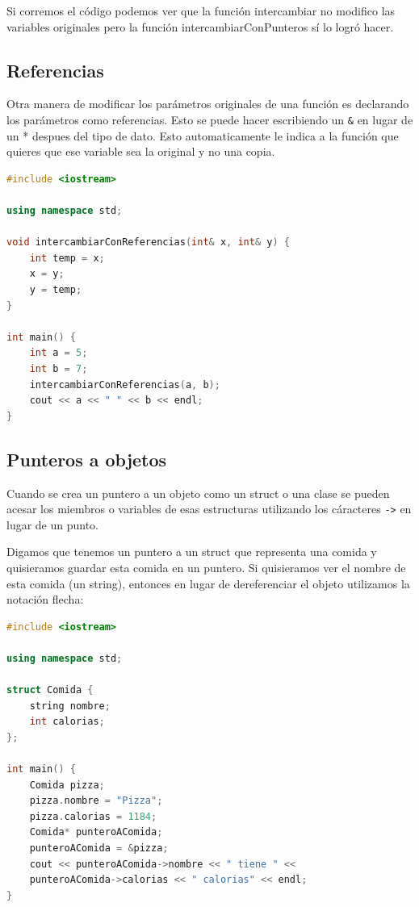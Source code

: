 \documentclass{article}
\begin{document}
Si corremos el código podemos ver que la función intercambiar no modifico las variables originales pero la función intercambiarConPunteros sí lo logró hacer.

\subsection{Referencias}

Otra manera de modificar los parámetros originales de una función es declarando los parámetros como referencias. Esto se puede hacer escribiendo un \lstinline{&} en lugar de un * despues del tipo de dato. Esto automaticamente le indica a la función que quieres que ese variable sea la original y no una copia.

\begin{lstlisting}[language=C++, caption=Funciones con referencias]
#include <iostream>

using namespace std;

void intercambiarConReferencias(int& x, int& y) {
    int temp = x;
    x = y;
    y = temp;
}

int main() {
    int a = 5;
    int b = 7;
    intercambiarConReferencias(a, b);
    cout << a << " " << b << endl;
}
\end{lstlisting}

\subsection{Punteros a objetos}

Cuando se crea un puntero a un objeto como un struct o una clase se pueden acesar los miembros o variables de esas estructuras utilizando los cáracteres \lstinline{->} en lugar de un punto.

Digamos que tenemos un puntero a un struct que representa una comida y quisieramos guardar esta comida en un puntero. Si quisieramos ver el nombre de esta comida (un string), entonces en lugar de dereferenciar el objeto utilizamos la notación flecha:

\begin{lstlisting}[language=C++, caption=Punteros a objetos]
#include <iostream>

using namespace std;

struct Comida {
    string nombre;
    int calorias;
};

int main() {
    Comida pizza;
    pizza.nombre = "Pizza";
    pizza.calorias = 1184;
    Comida* punteroAComida;
    punteroAComida = &pizza;
    cout << punteroAComida->nombre << " tiene " <<
    punteroAComida->calorias << " calorias" << endl;
}    
\end{lstlisting}
\end{document}
